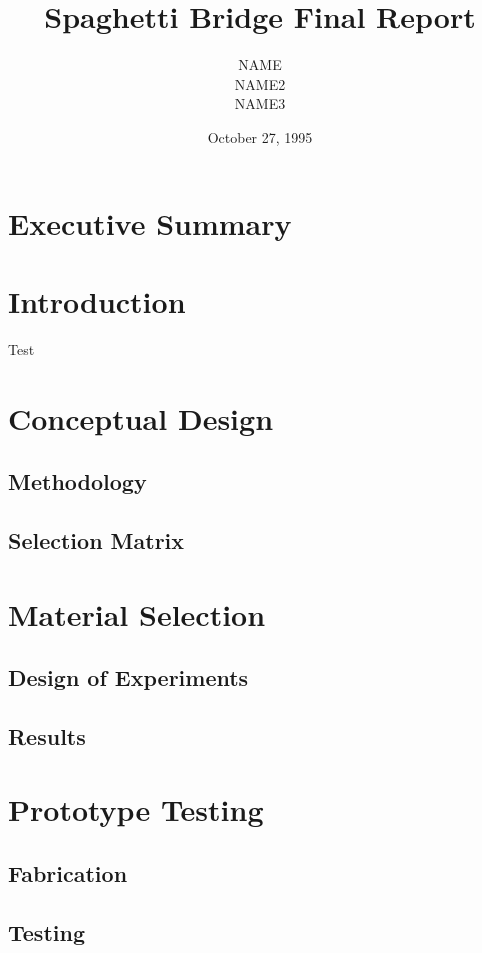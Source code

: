 \documentclass[]{article}
\begin{document}
\title{Spaghetti Bridge Final Report}
\author{NAME\\NAME2\\NAME3}
\date{October 27, 1995}
\maketitle
\newpage

\section{Executive Summary}

\newpage
\tableofcontents
\newpage

\section{Introduction}
Test \autocite{aec:redis}

\section{Conceptual Design}
\subsection{Methodology}
\subsection{Selection Matrix}

\section{Material Selection}
\subsection{Design of Experiments}
\subsection{Results}

\section{Prototype Testing}
\subsection{Fabrication}
\subsection{Testing}
\end{document}
